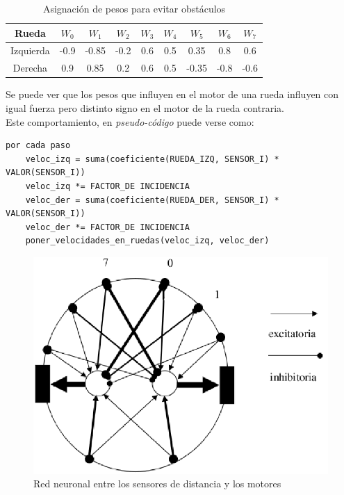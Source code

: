\begin{table}[ht]
	\begin{center}
		\begin{tabular}{ | c | c | c | c | c | c | c | c | c | }
			\hline 
			Rueda & $W_0$ & $W_1$ & $W_2$ & $W_3$ &  $W_4$ & $W_5$ & $W_6$ & $W_7$ \\
			\hline\hline
			Izquierda & -0.9 & -0.85 & -0.2 & 0.6 & 0.5 & 0.35 & 0.8 & 0.6 \\
			\hline
			Derecha & 0.9 & 0.85 & 0.2 & 0.6 & 0.5 & -0.35 & -0.8 & -0.6 \\
			\hline
		\end{tabular}
	\end{center}
	\label{pesos_obstaculo} 
	\caption{Asignaci\'on de pesos para evitar obst\'aculos}
\end{table}
Se puede ver que los pesos que influyen en el motor de una rueda influyen
con igual fuerza pero distinto signo en el motor de la rueda contraria.
\\\indent
Este comportamiento, en \emph{pseudo-c\'odigo} puede verse como:
\begin{verbatim}
por cada paso
    veloc_izq = suma(coeficiente(RUEDA_IZQ, SENSOR_I) * VALOR(SENSOR_I))
    veloc_izq *= FACTOR_DE INCIDENCIA
    veloc_der = suma(coeficiente(RUEDA_DER, SENSOR_I) * VALOR(SENSOR_I))
    veloc_der *= FACTOR_DE INCIDENCIA
    poner_velocidades_en_ruedas(veloc_izq, veloc_der)
\end{verbatim}

\begin{figure}[htp]
\begin{center}
\includegraphics[scale=0.4]{comportamientos/figures/red.png}
\caption{Red neuronal entre los sensores de distancia y los motores}
\label{fig:redN}
\end{center}
\end{figure}

